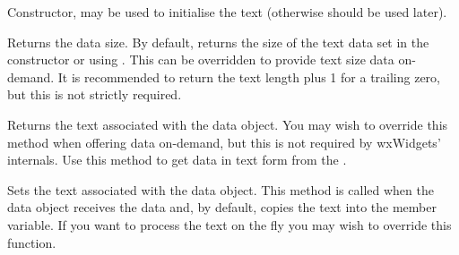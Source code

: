 \label{wxtextdataobjectwxtextdataobject}


Constructor, may be used to initialise the text (otherwise 
 should be used later).

\label{wxtextdataobjectgettextlength}


Returns the data size. By default, returns the size of the text data
set in the constructor or using .
This can be overridden to provide text size data on-demand. It is recommended
to return the text length plus 1 for a trailing zero, but this is not
strictly required.

\label{wxtextdataobjectgettext}


Returns the text associated with the data object. You may wish to override
this method when offering data on-demand, but this is not required by
wxWidgets' internals. Use this method to get data in text form from
the .

\label{wxtextdataobjectsettext}


Sets the text associated with the data object. This method is called
when the data object receives the data and, by default, copies the text into
the member variable. If you want to process the text on the fly you may wish to
override this function.


